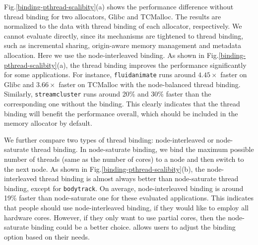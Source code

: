 


Fig.\ref{binding-pthread-scalibity}(a) shows the performance difference without thread binding for two allocators, Glibc and TCMalloc. The results are normalized to the data with thread binding of each allocator, respectively. We cannot evaluate \NM{} directly, since its mechanisms are tightened to thread binding, such as incremental sharing, origin-aware memory management and metadata allocation. Here we use the node-interleaved binding. As shown in Fig.\ref{binding-pthread-scalibity}(a), the thread binding improves the performance significantly for some applications. For instance, \texttt{fluidanimate} runs around $4.45\times$ faster on Glibc and $3.66\times$ faster on TCMalloc with the node-balanced thread binding. Similarly, \texttt{streamcluster} runs around 20\% and 30\% faster than the corresponding one without the binding. This clearly indicates that the thread binding will benefit the performance overall, which should be included in the memory allocator by default. 


We further compare two types of thread binding: node-interleaved or node-saturate thread binding. In node-saturate binding, we bind the maximum possible number of threads (same as the number of cores) to a node and then switch to the next node. As shown in Fig.\ref{binding-pthread-scalibity}(b), the node-interleaved thread binding is almost always better than node-saturate thread binding, except for \texttt{bodytrack}. On average, node-interleaved binding is around 19\% faster than node-saturate one for these evaluated applications. This indicates that people should use node-interleaved binding, if they would like to employ all hardware cores. However, if they only want to use partial cores, then the node-saturate binding could be a better choice. \NM{} allows users to adjust the binding option based on their needs.


